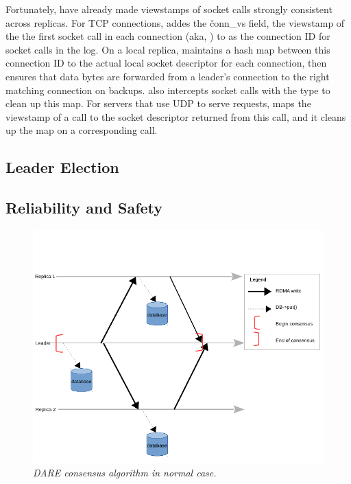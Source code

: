 Fortunately, \paxos have already made viewstamps of socket calls strongly 
consistent across replicas. For TCP connections, \xxx addes the 
\v{conn\_vs} field, the viewstamp of the the first socket call in each 
connection (aka, \accept) to as the connection ID for socket calls in the 
log. On a local replica, \xxx maintains a hash map between this connection ID 
to the actual local socket descriptor for each connection, then \xxx ensures 
that data bytes are forwarded from a leader's connection to the right matching 
connection on backups. \xxx also intercepts socket calls with the \close type 
to clean up this map. For servers that use UDP to serve requests, \xxx maps the 
viewstamp of a \recvfrom call to the socket descriptor returned from this call, 
and it cleans up the map on a corresponding \sendto call. 






\subsection{Leader Election} \label{sec:election}



\subsection{Reliability and Safety} \label{sec:guarantees}

\begin{figure}[t]
\centering
\vspace{-.20in}
\includegraphics[width=.5\textwidth]{figures/dare}
\vspace{-.20in}
\caption{{\em DARE consensus algorithm in normal case.}} \label{fig:dare}
\vspace{-.05in}
\end{figure}

